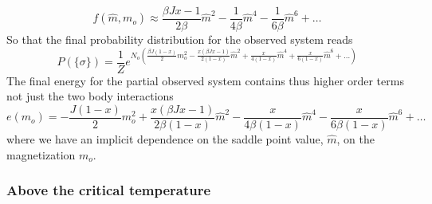 \documentclass[aps,pre,noshowpacs]{revtex4}
\begin{document}
\begin{equation}\label{smallexp}
f(\hat{m},m_o) \approx \frac{\beta J x -1}{2\beta} \hat{m}^2 -\frac{1}{4\beta} \hat{m}^4 -\frac{1}{6\beta} \hat{m}^6 + \ldots
\end{equation}
So that the final probability distribution for the observed system reads
\begin{equation}
P(\{\sigma\}) = \frac{1}{Z}e^{N_o \left(\frac{ \beta J (1-x) }{2}m_o^2 - \frac{x(\beta J x -1)}{2 (1-x)} \hat{m}^2 +\frac{x}{4(1-x)} \hat{m}^4 +\frac{x}{6 (1-x)} \hat{m}^6 + \ldots\right)}
\end{equation}
The final energy for the partial observed system contains thus higher order terms not just the two body interactions
\begin{equation}\label{energy}
e(m_o) = -\frac{J (1-x) }{2} m_o^2 +\frac{x(\beta J x -1)}{2\beta (1-x)} \hat{m}^2 -\frac{x}{4\beta(1-x)} \hat{m}^4 -\frac{x}{6 \beta (1-x)} \hat{m}^6 + \ldots
 \end{equation}
where we have an implicit dependence on the saddle point value, $\hat{m}$, on the magnetization $m_o$. 

\subsubsection{Above the critical temperature}
\end{document}
